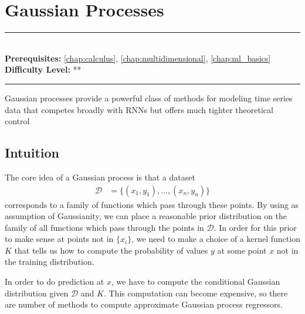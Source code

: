 \documentclass[book.tex]{subfiles}
\begin{document}
\chapter{Gaussian Processes}
\label{chap:gaussian_processes}
\noindent\rule{11cm}{0.4pt} \\
\textbf{Prerequisites:} \autoref{chap:calculus}, \autoref{chap:multidimensional}, \autoref{chap:ml_basics}  \\
\textbf{Difficulty Level:} ** \\
\noindent\rule{11cm}{0.4pt}
\vspace{5mm}

Gaussian processes provide a powerful class of methods for modeling time series data that competes broadly with RNNs but offers much tighter theoretical control 

\section{Intuition}

The core idea of a Gaussian process is that a dataset
\begin{align}
\mathcal{D} &= \{(x_1, y_1),\dotsc, (x_n, y_n)\}
\end{align}
corresponds to a family of functions which pass through these points. By using as assumption of Gaussianity, we can place a reasonable prior distribution on the family of all functions which pass through the points in $\mathcal{D}$. In order for this prior to make sense at points not in $\{x_i\}$, we need to make a choice of a kernel function $K$ that tells us how to compute the probability of values $y$ at some point $x$ not in the training distribution.

In order to do prediction at $x$, we have to compute the conditional Gaussian distribution given $\mathcal{D}$ and $K$. This computation can become expensive, so there are number of methods to compute approximate Gaussian process regressors.
\end{document}
